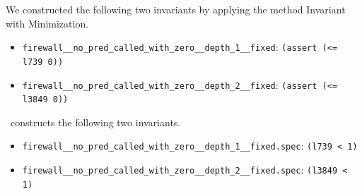 \documentclass{llncs}
\begin{document}
We constructed the following two invariants by applying the method
Invariant with Minimization.

\begin{itemize}
\item \verb?firewall__no_pred_called_with_zero__depth_1__fixed?: \verb?(assert (<= l739 0))?
\item \verb?firewall__no_pred_called_with_zero__depth_2__fixed?: \verb?(assert (<= l3849 0))?
\end{itemize}

\iic\ constructs the following two invariants.

\begin{itemize}
\item \verb=firewall__no_pred_called_with_zero__depth_1__fixed.spec=: \verb=(l739 < 1)=
\item \verb=firewall__no_pred_called_with_zero__depth_2__fixed.spec=: \verb=(l3849 < 1)=
\end{itemize}

\fi
\end{document}
